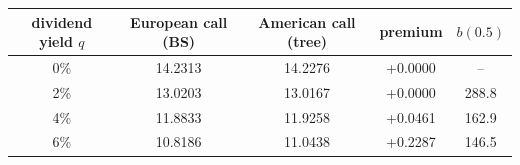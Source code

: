\begin{tabular}{ccccc}
\toprule
dividend yield $q$ & European call (BS) & American call (tree) & premium & $b(0.5)$ \\
\midrule
0\% & 14.2313 & 14.2276 & +0.0000 & -- \\
2\% & 13.0203 & 13.0167 & +0.0000 & 288.8 \\
4\% & 11.8833 & 11.9258 & +0.0461 & 162.9 \\
6\% & 10.8186 & 11.0438 & +0.2287 & 146.5 \\
\bottomrule
\end{tabular}
